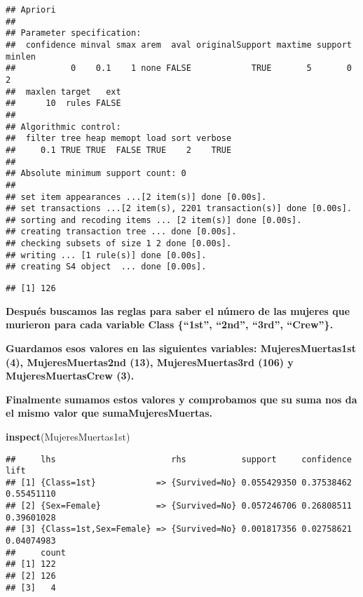 \documentclass[]{article}
\newenvironment{Shaded}{\begin{snugshade}}{\end{snugshade}}
\newcommand{\DecValTok}[1]{\textcolor[rgb]{0.00,0.00,0.81}{#1}}
\newcommand{\KeywordTok}[1]{\textcolor[rgb]{0.13,0.29,0.53}{\textbf{#1}}}
\newcommand{\NormalTok}[1]{#1}
\newcommand{\OperatorTok}[1]{\textcolor[rgb]{0.81,0.36,0.00}{\textbf{#1}}}
\newcommand{\StringTok}[1]{\textcolor[rgb]{0.31,0.60,0.02}{#1}}
\begin{document}
\begin{verbatim}
## Apriori
## 
## Parameter specification:
##  confidence minval smax arem  aval originalSupport maxtime support minlen
##           0    0.1    1 none FALSE            TRUE       5       0      2
##  maxlen target   ext
##      10  rules FALSE
## 
## Algorithmic control:
##  filter tree heap memopt load sort verbose
##     0.1 TRUE TRUE  FALSE TRUE    2    TRUE
## 
## Absolute minimum support count: 0 
## 
## set item appearances ...[2 item(s)] done [0.00s].
## set transactions ...[2 item(s), 2201 transaction(s)] done [0.00s].
## sorting and recoding items ... [2 item(s)] done [0.00s].
## creating transaction tree ... done [0.00s].
## checking subsets of size 1 2 done [0.00s].
## writing ... [1 rule(s)] done [0.00s].
## creating S4 object  ... done [0.00s].
\end{verbatim}

\begin{Shaded}
\end{Shaded}

\begin{verbatim}
## [1] 126
\end{verbatim}

\textbf{Después buscamos las reglas para saber el número de las mujeres
que murieron para cada variable Class \{``1st'', ``2nd'', ``3rd'',
``Crew''\}.}

\textbf{Guardamos esos valores en las siguientes variables:
MujeresMuertas1st (4), MujeresMuertas2nd (13), MujeresMuertas3rd (106) y
MujeresMuertasCrew (3).}

\textbf{Finalmente sumamos estos valores y comprobamos que su suma nos
da el mismo valor que sumaMujeresMuertas.}

\begin{Shaded}
\begin{Highlighting}[]
\KeywordTok{inspect}\NormalTok{(MujeresMuertas1st)}
\end{Highlighting}
\end{Shaded}

\begin{verbatim}
##     lhs                       rhs           support     confidence lift      
## [1] {Class=1st}            => {Survived=No} 0.055429350 0.37538462 0.55451110
## [2] {Sex=Female}           => {Survived=No} 0.057246706 0.26808511 0.39601028
## [3] {Class=1st,Sex=Female} => {Survived=No} 0.001817356 0.02758621 0.04074983
##     count
## [1] 122  
## [2] 126  
## [3]   4
\end{verbatim}
\end{document}
